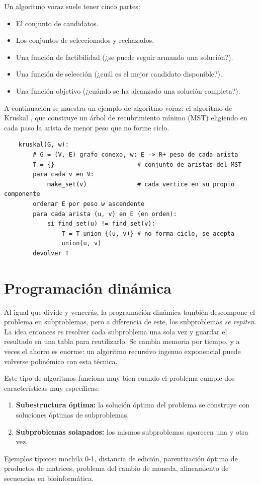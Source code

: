 \documentclass[12pt,letterpaper]{article}
\begin{document}
Un algoritmo voraz suele tener cinco partes:
\begin{itemize}
    \item El conjunto de candidatos.
    \item Los conjuntos de seleccionados y rechazados.
    \item Una función de factibilidad (¿se puede seguir armando una solución?).
    \item Una función de selección (¿cuál es el mejor candidato disponible?).
    \item Una función objetivo (¿cuándo se ha alcanzado una solución completa?).
\end{itemize}

A continuación se muestra un ejemplo de algoritmo voraz: el algoritmo de Kruskal
, que construye un árbol de recubrimiento mínimo (MST) eligiendo en cada paso 
la arista de menor peso que no forme ciclo.

\begin{verbatim}
    kruskal(G, w):
        # G = (V, E) grafo conexo, w: E -> R+ peso de cada arista
        T = {}                       # conjunto de aristas del MST
        para cada v en V:
            make_set(v)              # cada vertice en su propio componente
        ordenar E por peso w ascendente
        para cada arista (u, v) en E (en orden):
            si find_set(u) != find_set(v):
                T = T union {(u, v)} # no forma ciclo, se acepta
                union(u, v)
        devolver T
\end{verbatim}


\section{Programación dinámica}
\label{sec:dp}

Al igual que divide y vencerás, la programación dinámica también descompone el 
problema en subproblemas, pero a diferencia de este, los subproblemas 
\emph{se repiten}. La idea entonces es resolver cada subproblema una sola vez 
y guardar el resultado en una tabla para reutilizarlo. Se cambia memoria por 
tiempo, y a veces el ahorro es enorme: un algoritmo recursivo ingenuo 
exponencial puede volverse polinómico con esta técnica.

Este tipo de algoritmos funciona muy bien cuando el problema cumple dos 
características muy específicas:
\begin{enumerate}
    \item \textbf{Subestructura óptima:} la solución óptima del problema se 
    construye con soluciones óptimas de subproblemas.
    \item \textbf{Subproblemas solapados:} los mismos subproblemas aparecen 
    una y otra vez.
\end{enumerate}
Ejemplos típicos: mochila 0-1, distancia de edición, parentización óptima de 
productos de matrices, problema del cambio de moneda, alineamiento de 
secuencias en bioinformática.
\end{document}
